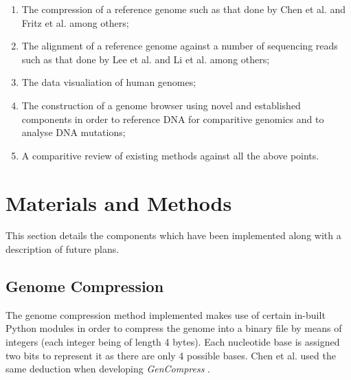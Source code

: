 \documentclass{csfyp}
\begin{document}
\begin{enumerate}[nolistsep]

   \item The compression of a reference genome such as that done by Chen et al. \cite{gencompress} and Fritz et al. \cite{refcompression} among others;

  \item The alignment of a reference genome against a number of sequencing reads such as that done by Lee et al. \cite{cgreads} and Li et al. \cite{bwtransform} among others;

  \item The data visualiation of human genomes;

  \item The construction of a genome browser using novel and established components in order to reference DNA for comparitive genomics and to analyse DNA mutations;  

  \item A comparitive review of existing methods against all the above points.

\end{enumerate}


\section{Materials and Methods}

This section details the components which have been implemented along with a description of future plans.

\subsection{Genome Compression}
The genome compression method implemented makes use of certain in-built Python modules in order to compress the genome into a binary file by means of integers (each integer being of length 4 bytes).  Each nucleotide base is assigned two bits to represent it as there are only 4 possible bases. Chen et al. used the same deduction when developing {\textit{GenCompress}} \cite{gencompress}.  
\end{document}
